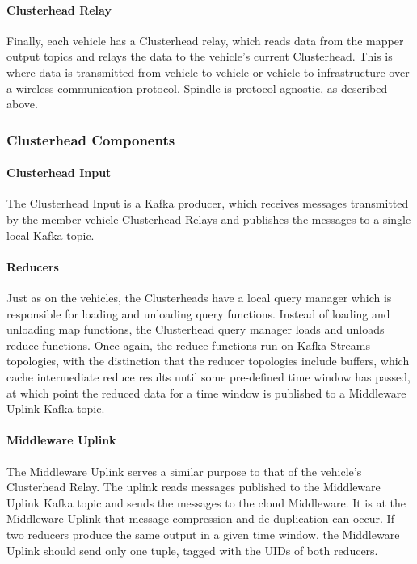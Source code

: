 \documentclass{thesis}
\begin{document}
    \paragraph{Clusterhead Relay}
        Finally, each vehicle has a Clusterhead relay, which reads data from the mapper output topics and relays the data to
        the vehicle's current Clusterhead. This is where data is transmitted from vehicle to vehicle or vehicle to infrastructure
        over a wireless communication protocol. Spindle is protocol agnostic, as described above.
\subsubsection{Clusterhead Components}
    \paragraph{Clusterhead Input}
        The Clusterhead Input is a Kafka producer, which receives messages transmitted by the member vehicle
        Clusterhead Relays and publishes the messages to a single local Kafka topic.
    \paragraph{Reducers}
        Just as on the vehicles, the Clusterheads have a local query manager which is responsible for loading and unloading
        query functions. Instead of loading and unloading map functions, the Clusterhead query manager loads and unloads
        reduce functions. Once again, the reduce functions run on Kafka Streams topologies, with the distinction that the
        reducer topologies include buffers, which cache intermediate reduce results until some pre-defined time window
        has passed, at which point the reduced data for a time window is published to a Middleware Uplink Kafka topic.
    \paragraph{Middleware Uplink}
        The Middleware Uplink serves a similar purpose to that of the vehicle's Clusterhead Relay. The uplink
        reads messages published to the Middleware Uplink Kafka topic and sends the messages to the cloud Middleware.
        It is at the Middleware Uplink that message compression and de-duplication can occur. If two reducers produce
        the same output in a given time window, the Middleware Uplink should send only one tuple, tagged with the UIDs
        of both reducers. %
\end{document}
